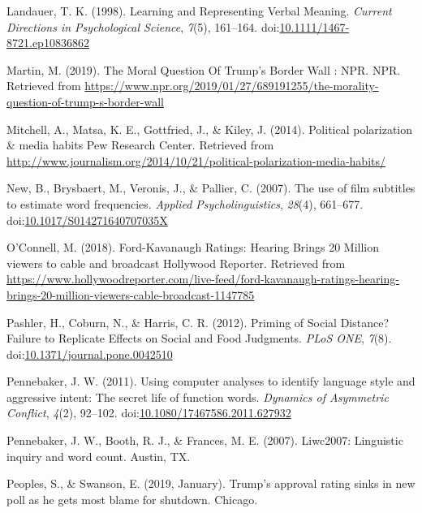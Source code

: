 \documentclass[english,,man]{apa6}
\begin{document}
\leavevmode\hypertarget{ref-Landauer1998}{}%
Landauer, T. K. (1998). Learning and Representing Verbal Meaning. \emph{Current Directions in Psychological Science}, \emph{7}(5), 161--164. doi:\href{https://doi.org/10.1111/1467-8721.ep10836862}{10.1111/1467-8721.ep10836862}

\leavevmode\hypertarget{ref-Martin2019}{}%
Martin, M. (2019). The Moral Question Of Trump's Border Wall : NPR. NPR. Retrieved from \url{https://www.npr.org/2019/01/27/689191255/the-morality-question-of-trump-s-border-wall}

\leavevmode\hypertarget{ref-Mitchell2014}{}%
Mitchell, A., Matsa, K. E., Gottfried, J., \& Kiley, J. (2014). Political polarization \& media habits \textbar{} Pew Research Center. Retrieved from \url{http://www.journalism.org/2014/10/21/political-polarization-media-habits/}

\leavevmode\hypertarget{ref-New2007}{}%
New, B., Brysbaert, M., Veronis, J., \& Pallier, C. (2007). The use of film subtitles to estimate word frequencies. \emph{Applied Psycholinguistics}, \emph{28}(4), 661--677. doi:\href{https://doi.org/10.1017/S014271640707035X}{10.1017/S014271640707035X}

\leavevmode\hypertarget{ref-OConnell2018}{}%
O'Connell, M. (2018). Ford-Kavanaugh Ratings: Hearing Brings 20 Million viewers to cable and broadcast \textbar{} Hollywood Reporter. Retrieved from \url{https://www.hollywoodreporter.com/live-feed/ford-kavanaugh-ratings-hearing-brings-20-million-viewers-cable-broadcast-1147785}

\leavevmode\hypertarget{ref-Pashler2012}{}%
Pashler, H., Coburn, N., \& Harris, C. R. (2012). Priming of Social Distance? Failure to Replicate Effects on Social and Food Judgments. \emph{PLoS ONE}, \emph{7}(8). doi:\href{https://doi.org/10.1371/journal.pone.0042510}{10.1371/journal.pone.0042510}

\leavevmode\hypertarget{ref-Pennebaker2011}{}%
Pennebaker, J. W. (2011). Using computer analyses to identify language style and aggressive intent: The secret life of function words. \emph{Dynamics of Asymmetric Conflict}, \emph{4}(2), 92--102. doi:\href{https://doi.org/10.1080/17467586.2011.627932}{10.1080/17467586.2011.627932}

\leavevmode\hypertarget{ref-Pennebaker2007}{}%
Pennebaker, J. W., Booth, R. J., \& Frances, M. E. (2007). Liwc2007: Linguistic inquiry and word count. Austin, TX.

\leavevmode\hypertarget{ref-Peoples2019}{}%
Peoples, S., \& Swanson, E. (2019, January). Trump's approval rating sinks in new poll as he gets most blame for shutdown. Chicago.
\end{document}
